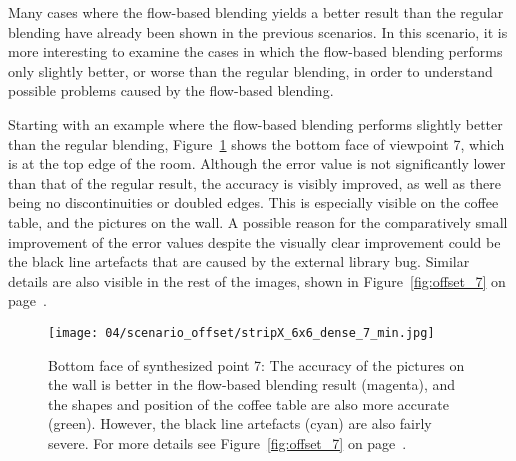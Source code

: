 Many cases where the flow-based blending yields a better result than the regular blending have already been shown in the previous scenarios. In this scenario, it is more interesting to examine the cases in which the flow-based blending performs only slightly better, or worse than the regular blending, in order to understand possible problems caused by the flow-based blending.

Starting with an example where the flow-based blending performs slightly better than the regular blending, Figure~\ref{fig:offset_7_min} shows the bottom face of viewpoint 7, which is at the top edge of the room. Although the error value is not significantly lower than that of the regular result, the accuracy is visibly improved, as well as there being no discontinuities or doubled edges. This is especially visible on the coffee table, and the pictures on the wall. A possible reason for the comparatively small improvement of the error values despite the visually clear improvement could be the black line artefacts that are caused by the external library bug. Similar details are also visible in the rest of the images, shown in Figure~\ref{fig:offset_7} on page~\pageref{fig:offset_7}.

\begin{figure}
  \centering
  \texttt{[image: 04/scenario\_offset/stripX\_6x6\_dense\_7\_min.jpg]}
  \caption[Bottom face of viewpoint 7 of 625 in the square room]{Bottom face of synthesized point 7: The accuracy of the pictures on the wall is better in the flow-based blending result (magenta), and the shapes and position of the coffee table are also more accurate (green). However, the black line artefacts (cyan) are also fairly severe. For more details see Figure~\ref{fig:offset_7} on page~\pageref{fig:offset_7}.}
  \label{fig:offset_7_min}
\end{figure}


